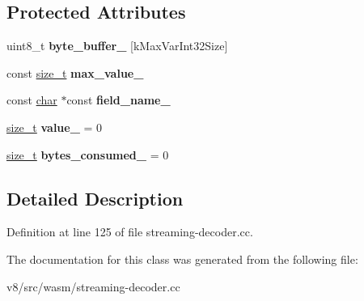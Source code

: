 \subsection*{Protected Attributes}
\begin{DoxyCompactItemize}
\item 
\mbox{\label{classv8_1_1internal_1_1wasm_1_1StreamingDecoder_1_1DecodeVarInt32_aa45d219a0c47667ac7c321355817a241}} 
uint8\+\_\+t {\bfseries byte\+\_\+buffer\+\_\+} \mbox{[}k\+Max\+Var\+Int32\+Size\mbox{]}
\item 
\mbox{\label{classv8_1_1internal_1_1wasm_1_1StreamingDecoder_1_1DecodeVarInt32_ae3b50230bed6fdb089ee7e17c24c8d45}} 
const \mbox{\hyperlink{classsize__t}{size\+\_\+t}} {\bfseries max\+\_\+value\+\_\+}
\item 
\mbox{\label{classv8_1_1internal_1_1wasm_1_1StreamingDecoder_1_1DecodeVarInt32_aa9667edfbff8069403843c8c56c11882}} 
const \mbox{\hyperlink{classchar}{char}} $\ast$const {\bfseries field\+\_\+name\+\_\+}
\item 
\mbox{\label{classv8_1_1internal_1_1wasm_1_1StreamingDecoder_1_1DecodeVarInt32_a8dc15f05508652c5e4049dee2375daec}} 
\mbox{\hyperlink{classsize__t}{size\+\_\+t}} {\bfseries value\+\_\+} = 0
\item 
\mbox{\label{classv8_1_1internal_1_1wasm_1_1StreamingDecoder_1_1DecodeVarInt32_a111e588abca7e05bb51e3faea7daf3a4}} 
\mbox{\hyperlink{classsize__t}{size\+\_\+t}} {\bfseries bytes\+\_\+consumed\+\_\+} = 0
\end{DoxyCompactItemize}


\subsection{Detailed Description}


Definition at line 125 of file streaming-\/decoder.\+cc.



The documentation for this class was generated from the following file\+:\begin{DoxyCompactItemize}
\item 
v8/src/wasm/streaming-\/decoder.\+cc\end{DoxyCompactItemize}
